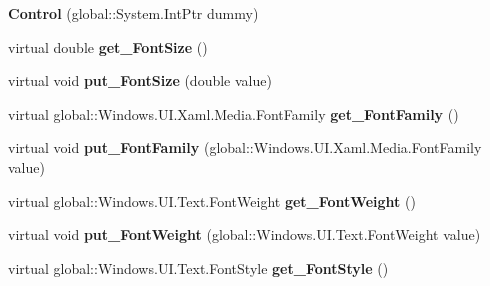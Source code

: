 \begin{DoxyCompactItemize}
{\bfseries Control} (global\+::\+System.\+Int\+Ptr dummy)
\item 
\mbox{\label{class_windows_1_1_u_i_1_1_xaml_1_1_controls_1_1_control_a56b25a73046ea0559a9e7cc2806702e8}} 
virtual double {\bfseries get\+\_\+\+Font\+Size} ()
\item 
\mbox{\label{class_windows_1_1_u_i_1_1_xaml_1_1_controls_1_1_control_af511651d84c62e096804d65532964059}} 
virtual void {\bfseries put\+\_\+\+Font\+Size} (double value)
\item 
\mbox{\label{class_windows_1_1_u_i_1_1_xaml_1_1_controls_1_1_control_ad993e612b853d9afcb875a5e4234fcc1}} 
virtual global\+::\+Windows.\+U\+I.\+Xaml.\+Media.\+Font\+Family {\bfseries get\+\_\+\+Font\+Family} ()
\item 
\mbox{\label{class_windows_1_1_u_i_1_1_xaml_1_1_controls_1_1_control_af2d5ee1323dfd2ae954b480a76f90bba}} 
virtual void {\bfseries put\+\_\+\+Font\+Family} (global\+::\+Windows.\+U\+I.\+Xaml.\+Media.\+Font\+Family value)
\item 
\mbox{\label{class_windows_1_1_u_i_1_1_xaml_1_1_controls_1_1_control_a7ebe7963613a80ab54042ed42d0fa16d}} 
virtual global\+::\+Windows.\+U\+I.\+Text.\+Font\+Weight {\bfseries get\+\_\+\+Font\+Weight} ()
\item 
\mbox{\label{class_windows_1_1_u_i_1_1_xaml_1_1_controls_1_1_control_acf14fc60ff1e6b2aacf2503e680ebc89}} 
virtual void {\bfseries put\+\_\+\+Font\+Weight} (global\+::\+Windows.\+U\+I.\+Text.\+Font\+Weight value)
\item 
\mbox{\label{class_windows_1_1_u_i_1_1_xaml_1_1_controls_1_1_control_a3083dad6568d1d20caa957d9a785e415}} 
virtual global\+::\+Windows.\+U\+I.\+Text.\+Font\+Style {\bfseries get\+\_\+\+Font\+Style} ()
\item 
\mbox{\label{class_windows_1_1_u_i_1_1_xaml_1_1_controls_1_1_control_a823b5b7960c23d5b8bb2f92876534959}} 

\end{DoxyCompactItemize}
